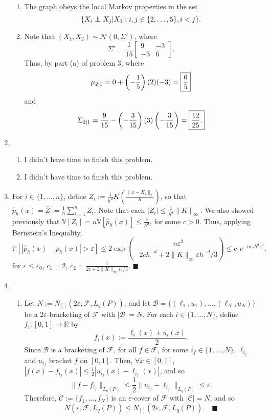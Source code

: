 \documentclass[11pt]{article}
\renewcommand{\qed}{\quad \ensuremath{\blacksquare}}
\newcommand{\Fc}{\mathscr{F}} %
\newcommand{\pr}{\mathbb{P}} %
\newcommand{\Var}{\mathbb{V}} %
\newcommand{\R}{\mathbb{R}} %
\newcommand{\B}{\mathscr{B}}
\newcommand{\C}{\mathscr{C}} %
\newcommand{\e}{\varepsilon} %
\newcommand{\ol}{\overline}
\renewcommand{\hat}{\widehat}
\newcommand\ind{\protect\mathpalette{\protect\independenT}{\perp}}
\def\independenT#1#2{\mathrel{\rlap{$#1#2$}\mkern2mu{#1#2}}}
\begin{document}
\begin{enumerate}
\begin{enumerate}
\item The graph obeys the local Markov properties in the set
\[\{X_i \ind X_j | X_1 : i,j \in \{2,\dots,5\}, i < j\}.\]

\item Note that $(X_1,X_2) \sim \mathcal{N}(0,\Sigma')$, where
\[\Sigma' = \frac{1}{15}
    \begin{bmatrix}
        9 & -3 \\
        -3 & 6
    \end{bmatrix}.\]
Thus, by part (a) of problem 3,
 where
\[\mu_{2|1}
    = 0 + \left( -\frac{1}{5} \right)(2)(-3)
    = \mbox{\fbox{$\displaystyle \frac{6}{5}$}}\]
and
\[\Sigma_{2|1}
    = \frac{9}{15} - \left(-\frac{3}{15}\right)(3)\left(-\frac{3}{15}\right)
    = \mbox{\fbox{$\displaystyle \frac{12}{25}$.}}\]
\end{enumerate}

\item
\begin{enumerate}
\item I didn't have time to finish this problem.

\item I didn't have time to finish this problem.

\end{enumerate}

\item For $i \in \{1,\dots,n\}$, define
$Z_i := \frac{1}{h^d} K\left( \frac{\|x - X_i\|_2}{h} \right)$, so that
$\hat p_h(x) = \ol Z := \frac{1}{n} \sum_{i = 1}^n Z_i$. Note that
each $|Z_i| \leq \frac{1}{h^d} \|K\|_\infty$. We also showed previously that
$\Var[Z_i] = n \Var[\hat p_h(x)] \leq \frac{c}{h^d}$, for some $c > 0$. Thus,
applying Bernstein's Inequality,
\[\pr\left[ |\hat p_h(x) - p_h(x)| > \e \right]
    \leq 2 \exp\left( -\frac{n\e^2}{2ch^{-d}
                                        + 2\|K\|_\infty \e h^{-d}/3} \right)
    \leq c_1 e^{-n c_2 h^d \e^2},\]
for $\e \leq \e_0$, $c_1 = 2$, $c_2 = \frac{1}{2c + 2\|K\|_\infty\e_0/3}$. \qed

\newpage
\item
\begin{enumerate}
\item Let $N := N_{[]}(2\e,\Fc,L_q(P))$, and let
$\B = \{(\ell_1,u_1),\dots,(\ell_N,u_N)\}$ be a $2\e$-bracketing of $\Fc$ with
$|\B| = N$. For each $i \in \{1,\dots,N\}$, define
$f_i : [0,1] \to \R$ by
\[f_i(x) := \frac{\ell_i(x) + u_i(x)}{2}.\]
Since $\B$ is a bracketing of $\Fc$, for all $f \in \Fc$, for some
$i_f \in \{1,\dots,N\}$, $\ell_{i_f}$ and $u_{i_f}$ bracket
$f$ on $[0,1]$. Then, $\forall x \in [0,1]$,
$|f(x) - f_{i_f}(x)| \leq \frac{1}{2} |u_{i_f}(x) - \ell_{i_f}(x)|$, and so
\[\|f - f_{i_f}\|_{L_q(P)}
    \leq \frac{1}{2} \|u_{i_f} - \ell_{i_f}\|_{L_q(P)}
    \leq \e.\]
Therefore, $\C := \{f_1,\dots,f_N\}$ is an $\e$-cover of $\Fc$ with $|\C| = N$,
and so \[N(\e,\Fc,L_q(P)) \leq N_{[]}(2\e,\Fc,L_q(P)). \qed\]


\end{enumerate}
\end{enumerate}
\end{document}
